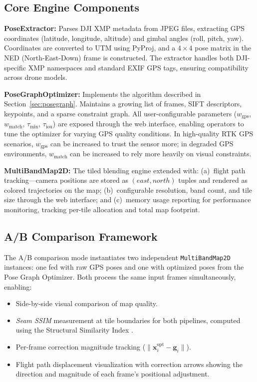 \documentclass[conference]{IEEEtran}
\begin{document}
\subsection{Core Engine Components}

\textbf{PoseExtractor:} Parses DJI XMP metadata from JPEG files, extracting GPS coordinates (latitude, longitude, altitude) and gimbal angles (roll, pitch, yaw). Coordinates are converted to UTM using PyProj, and a $4 \times 4$ pose matrix in the NED (North-East-Down) frame is constructed. The extractor handles both DJI-specific XMP namespaces and standard EXIF GPS tags, ensuring compatibility across drone models.

\textbf{PoseGraphOptimizer:} Implements the algorithm described in Section~\ref{sec:posegraph}. Maintains a growing list of frames, SIFT descriptors, keypoints, and a sparse constraint graph. All user-configurable parameters ($w_{\text{gps}}$, $w_{\text{match}}$, $\tau_{\text{min}}$, $\tau_{\text{iou}}$) are exposed through the web interface, enabling operators to tune the optimizer for varying GPS quality conditions. In high-quality RTK GPS scenarios, $w_{\text{gps}}$ can be increased to trust the sensor more; in degraded GPS environments, $w_{\text{match}}$ can be increased to rely more heavily on visual constraints.

\textbf{MultiBandMap2D:} The tiled blending engine extended with: (a)~flight path tracking---camera positions are stored as $(east, north)$ tuples and rendered as colored trajectories on the map; (b)~configurable resolution, band count, and tile size through the web interface; and (c)~memory usage reporting for performance monitoring, tracking per-tile allocation and total map footprint.

\subsection{A/B Comparison Framework}

The A/B comparison mode instantiates two independent \texttt{MultiBandMap2D} instances: one fed with raw GPS poses and one with optimized poses from the Pose Graph Optimizer. Both process the same input frames simultaneously, enabling:

\begin{itemize}
    \item Side-by-side visual comparison of map quality.
    \item \textit{Seam SSIM} measurement at tile boundaries for both pipelines, computed using the Structural Similarity Index \cite{ssim}.
    \item Per-frame correction magnitude tracking ($\|\mathbf{x}_i^{\text{opt}} - \mathbf{g}_i\|$).
    \item Flight path displacement visualization with correction arrows showing the direction and magnitude of each frame's positional adjustment.
\end{itemize}
\end{document}
